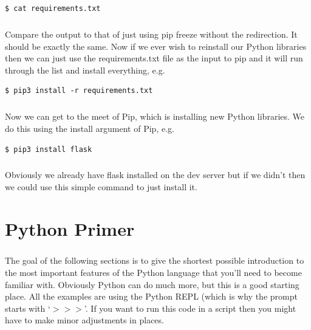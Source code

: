 \documentclass[12pt, a4paper, oneside]{book}
\begin{document}
\begin{lstlisting}[style=DOS]
    $ cat requirements.txt
\end{lstlisting}

\paragraph{} Compare the output to that of just using pip freeze without the redirection. It should be exactly the same. Now if we ever wish to reinstall our Python libraries then we can just use the requirements.txt file as the input to pip and it will run through the list and install everything, e.g.

\begin{lstlisting}[style=DOS]
    $ pip3 install -r requirements.txt
\end{lstlisting}

\paragraph{} Now we can get to the meet of Pip, which is installing new Python libraries. We do this using the install argument of Pip, e.g.

\begin{lstlisting}[style=DOS]
    $ pip3 install flask
\end{lstlisting}

\paragraph{} Obviously we already have flask installed on the dev server but if we didn't then we could use this simple command to just install it. 


\chapter{Python Primer}
\label{python-primer}

\paragraph{} The goal of the following sections is to give the shortest possible introduction to the most important features of the Python language that you'll need to become familiar with. Obviously Python can do much more, but this is a good starting place. All the examples are using the Python REPL (which is why the prompt starts with `$>>>$'. If you want to run this code in a script then you might have to make minor adjustments in places.
\end{document}
